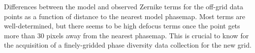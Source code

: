 Differences between the model and observed Zernike terms for the off-grid data points as a function of distance to the nearest model phasemap. Most terms are well-determined, but there seems to be high defocus terms once the point gets more than 30 pixels away from the nearest phasemap. This is crucial to know for the acquisition of a finely-gridded phase diversity data collection for the new grid. 
  